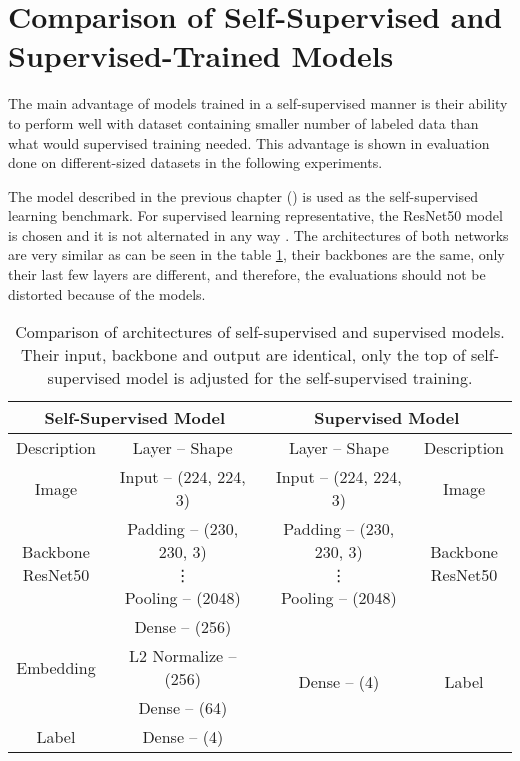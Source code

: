 \section{\label{sec:comparison}Comparison of Self-Supervised and Supervised-Trained Models}

The main advantage of models trained in a self-supervised manner is their ability to perform well with dataset containing smaller number of labeled data than what would supervised training needed. This advantage is shown in evaluation done on different-sized datasets in the following experiments.

The model described in the previous chapter () is used as the self-supervised learning benchmark. For supervised learning representative, the ResNet50 model is chosen and it is not alternated in any way \cite{he2015deep}. The architectures of both networks are very similar as can be seen in the table \ref{tab:self-supervised-vs-supervised}, their backbones are the same, only their last few layers are different, and therefore, the evaluations should not be distorted because of the models.

\begin{table}[!ht]
    \begin{center}
        \begin{tabular}{ |c|c||c|c| }
            \hline
                \multicolumn{2}{|c||}{Self-Supervised Model} & \multicolumn{2}{c|}{Supervised Model} \\
            \hline
            \hline
            Description & Layer -- Shape & Layer -- Shape & Description \\
            \hline
            \hline
                Image & Input -- (224, 224, 3) & Input -- (224, 224, 3) & Image \\
            \hline
                \makecell{Backbone \\ ResNet50} & \makecell{Padding -- (230, 230, 3) \\ \vdots \\ Pooling -- (2048)} & \makecell{Padding -- (230, 230, 3) \\ \vdots \\ Pooling -- (2048)} & \makecell{Backbone \\ ResNet50} \\
            \hline
                & Dense -- (256) & \multirow{4}{*}{Dense -- (4)} & \multirow{4}{*}{Label} \\
            \cline{1-2}
                Embedding & L2 Normalize -- (256) & & \\
            \cline{1-2}
                & Dense -- (64) & & \\
            \cline{1-2}
                Label & Dense -- (4) & & \\
            \hline
        \end{tabular}
    \end{center}
    \caption{Comparison of architectures of self-supervised and supervised models. Their input, backbone and output are identical, only the top of self-supervised model is adjusted for the self-supervised training.}
    \label{tab:self-supervised-vs-supervised}
\end{table}

